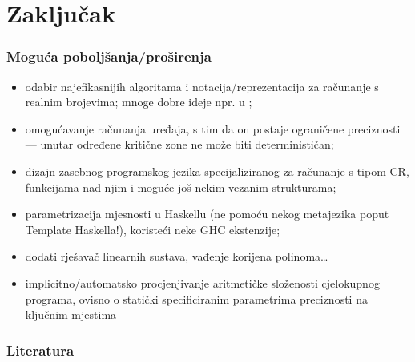 \documentclass{beamer}
\def\CR{\mathrm{CR}}
\begin{document}
\section{Zaključak}
\begin{frame}
    \frametitle{Moguća poboljšanja/proširenja}
    \begin{itemize}
        \item odabir najefikasnijih algoritama i notacija/reprezentacija za računanje s realnim brojevima; mnoge dobre ideje npr. u \cite{ram};
        \item omogućavanje računanja uređaja, s tim da on postaje \alert{ograničene preciznosti} --- unutar određene kritične zone ne može biti 
        determinističan;
        \item dizajn zasebnog programskog jezika specijaliziranog za računanje s tipom $\CR$, funkcijama nad njim i moguće još nekim vezanim strukturama;
        \item parametrizacija mjesnosti u Haskellu (ne pomoću nekog metajezika poput Template Haskella!), koristeći neke GHC ekstenzije;
        \item dodati rješavač linearnih sustava, vađenje korijena polinoma\ldots
        \item implicitno/automatsko procjenjivanje aritmetičke složenosti cjelokupnog programa, ovisno o statički specificiranim parametrima
        preciznosti na ključnim mjestima
    \end{itemize}
\end{frame}


\begin{frame}
    \frametitle{Literatura}
    \printbibliography
\end{frame}
\end{document}
